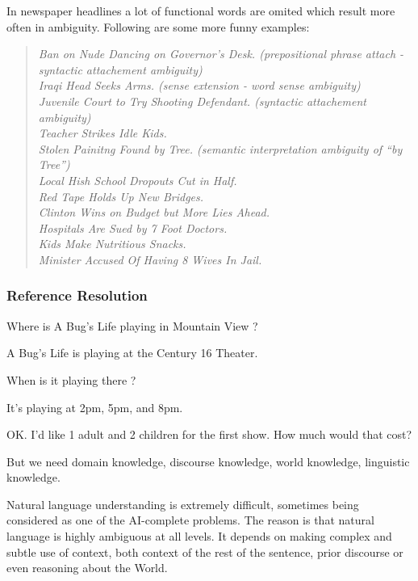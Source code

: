 \documentclass[a4paper,10pt]{report}
\begin{document}
In newspaper headlines a lot of functional words are omited which result more often in ambiguity. Following are some more funny examples:
\begin{quote}
 \textit{Ban on Nude Dancing on Governor's Desk. (prepositional phrase attach - syntactic attachement ambiguity)} \\
 \textit{Iraqi Head Seeks Arms. (sense extension - word sense ambiguity)} \\
 \textit{Juvenile Court to Try Shooting Defendant. (syntactic attachement ambiguity)} \\
 \textit{Teacher Strikes Idle Kids.} \\
 \textit{Stolen Painitng Found by Tree. (semantic interpretation ambiguity of ``by Tree'')} \\
 \textit{Local Hish School Dropouts Cut in Half.} \\
 \textit{Red Tape Holds Up New Bridges.} \\
 \textit{Clinton Wins on Budget but More Lies Ahead.} \\
 \textit{Hospitals Are Sued by 7 Foot Doctors.} \\
 \textit{Kids Make Nutritious Snacks.} \\
 \textit{Minister Accused Of Having 8 Wives In Jail.} \\
\end{quote}

\subsubsection*{Reference Resolution}

Where is {\color{red}A Bug’s Life} playing in {\color{red}Mountain View} ?

A Bug’s Life is playing at the Century 16 Theater.

When is {\color{green}it} playing {\color{green}there} ?

It’s playing at 2pm, 5pm, and 8pm.

OK. I’d like 1 {\color{blue}adult} and 2 {\color{blue}children} for {\color{blue}the first show}. How much would {\color{green}that} cost?

But we need {\color{red}domain knowledge}, {\color{green}discourse knowledge}, {\color{blue}world knowledge}, linguistic knowledge.

Natural language understanding is extremely difficult, sometimes being considered as one of the AI-complete problems. The reason is that natural language is highly ambiguous at all levels. It depends on making complex and subtle use of context, both context of the rest of the sentence, prior discourse or even reasoning about the World.
\end{document}
